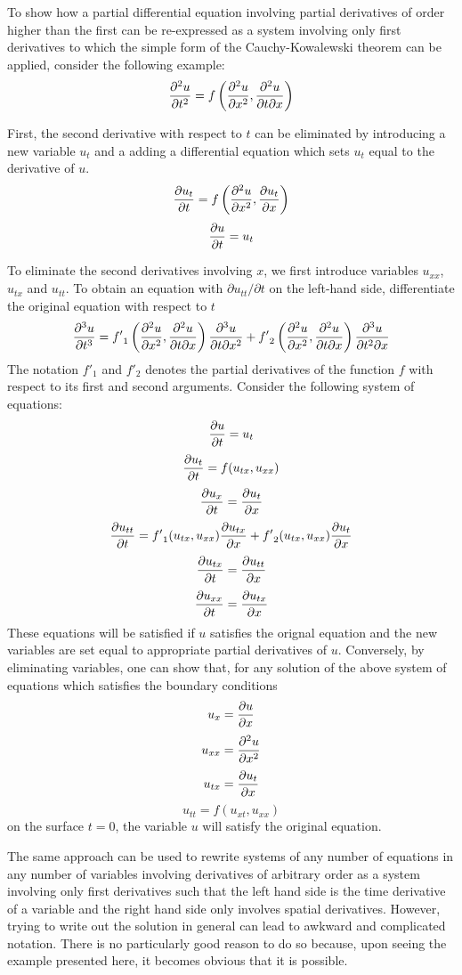 \documentclass[12pt]{article}
\begin{document}
To show how a partial differential equation involving partial derivatives of order higher than the first can be re-expressed as a system involving only first derivatives to which the simple form of the Cauchy-Kowalewski theorem can be applied, consider the following example:
 $${\partial^2 u \over \partial t^2} = f \left( {\partial^2 u \over \partial x^2}, 
{\partial^2 u \over \partial t \partial x} \right)$$

First, the second derivative with respect to $t$ can be eliminated by introducing a new variable $u_t$ and a adding a differential equation which sets $u_t$ equal to the derivative of $u$.
 $${\partial u_t \over \partial t} = f \left( {\partial^2 u \over \partial x^2}, {\partial u_t \over \partial x} \right)$$
 $${\partial u \over \partial t} = u_t$$

To eliminate the second derivatives involving $x$, we first introduce variables $u_{xx}$, $u_{tx}$ and $u_{tt}$.  To obtain an equation with $\partial u_{tt} / \partial t$ on the left-hand side, differentiate the original equation with respect to $t$
 $${\partial^3 u \over \partial t^3} = {f'}_1 \left( {\partial^2 u \over \partial x^2}, {\partial^2 u \over \partial t \partial x} \right) {\partial^3 u \over \partial t \partial x^2} + {f'}_2 \left( {\partial^2 u \over \partial x^2}, {\partial^2 u \over \partial t \partial x} \right) {\partial^3 u \over \partial t^2 \partial x}$$
The notation ${f'}_1$ and ${f'}_2$ denotes the partial derivatives of the function $f$ with respect to its first and second arguments.  Consider the following system of equations:
 $${\partial u \over \partial t} = u_t$$
 $${\partial u_t \over \partial t} = f (u_{tx}, u_{xx})$$
 $${\partial u_x \over \partial t} = {\partial u_t \over \partial x}$$
 $${\partial u_{tt} \over \partial t} = {f'}_1 (u_{tx}, u_{xx}) {\partial u_{tx} \over \partial x} + {f'}_2 (u_{tx}, u_{xx}) {\partial u_{t} \over \partial x}$$
 $${\partial u_{tx} \over \partial t} = {\partial u_{tt} \over \partial x}$$
 $${\partial u_{xx} \over \partial t} = {\partial u_{tx} \over \partial x}$$
These equations will be satisfied if $u$ satisfies the orignal equation and the new variables are set equal to appropriate partial derivatives of $u$.  Conversely, by eliminating variables, one can show that, for any solution of the above system of equations which satisfies the boundary conditions
 $$u_x = {\partial u \over \partial x}$$
 $$u_{xx} = {\partial^2 u \over \partial x^2}$$
 $$u_{tx} = {\partial u_t \over \partial x}$$
 $$u_{tt} = f(u_{xt},u_{xx})$$
on the surface $t = 0$, the variable $u$ will satisfy the original equation.

The same approach can be used to rewrite systems of any number of equations in any number of variables involving derivatives of arbitrary order as a system involving only first derivatives such that the left hand side is the time derivative of a variable and the right hand side only involves spatial derivatives.  However, trying to write out the solution in general can lead to awkward and complicated notation.  There is no particularly good reason to do so because, upon seeing the example presented here, it becomes obvious that it is possible.
\end{document}
